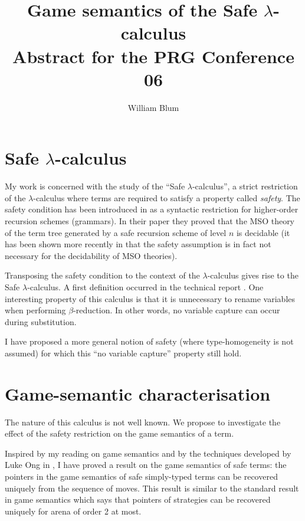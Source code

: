 \documentclass[12pt]{article}
\author{William Blum}
\title{Game semantics of the Safe $\lambda$-calculus\\ {\small Abstract for the PRG Conference 06}}
\begin{document}
\maketitle

\section{Safe $\lambda$-calculus}

My work is concerned with the study of the ``Safe
$\lambda$-calculus'', a strict restriction of the $\lambda$-calculus
where terms are required to satisfy a property called \emph{safety}.
The safety condition has been introduced in \cite{KNU02} as a
syntactic restriction for higher-order recursion schemes (grammars).
In their paper they proved that the MSO theory of the term tree
generated by a safe recursion scheme of level $n$ is decidable (it
has been shown more recently in \cite{OngLics2006} that the safety
assumption is in fact not necessary for the decidability of MSO
theories).

Transposing the safety condition to the context of the
$\lambda$-calculus gives rise to the Safe $\lambda$-calculus. A
first definition occurred in the technical report
\cite{safety-mirlong2004}. One interesting property of this calculus
is that it is unnecessary to rename variables when performing
$\beta$-reduction. In other words, no variable capture can occur
during substitution.

I have proposed a more general notion of safety (where
type-homogeneity is not assumed) for which this ``no variable
capture'' property still hold.

\section{Game-semantic characterisation}

The nature of this calculus is not well known. We propose to
investigate the effect of the safety restriction on the game
semantics of a term.


Inspired by my reading on game semantics
\citep{abramsky:game-semantics-tutorial} and by the techniques
developed by Luke Ong in \citep{OngLics2006}, I have proved a result
on the game semantics of safe terms: the pointers in the game
semantics of safe simply-typed terms can be recovered uniquely from
the sequence of moves. This result is similar to the standard result
in game semantics which says that pointers of strategies can be
recovered uniquely for arena of order 2 at most.




\end{document}
